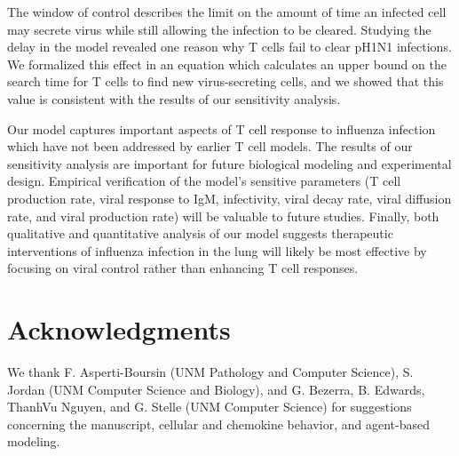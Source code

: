 \documentclass[10pt]{article}
\begin{document}
The window of control describes the limit on the amount of time an infected cell may secrete virus while still allowing the infection to be cleared.  Studying the delay in the model revealed one reason why T cells fail to clear pH1N1 infections.  We formalized this effect in an equation which calculates an upper bound on the search time for T cells to find new virus-secreting cells, and we showed that this value is consistent with the results of our sensitivity analysis.

Our model captures important aspects of T cell response to influenza infection which have not been addressed by earlier T cell models.  The results of our sensitivity analysis are important for future biological modeling and experimental design.  Empirical verification of the model's sensitive parameters (T cell production rate, viral response to IgM, infectivity, viral decay rate, viral diffusion rate, and viral production rate) will be valuable to future studies.  Finally, both qualitative and quantitative analysis of our model suggests therapeutic interventions of influenza infection in the lung will likely be most effective by focusing on viral control rather than enhancing T cell responses.









\section*{Acknowledgments}

We thank F. Asperti-Boursin (UNM Pathology and Computer Science), S. Jordan (UNM Computer Science and Biology), and G. Bezerra, B. Edwards, ThanhVu Nguyen, and G. Stelle (UNM Computer Science) for suggestions concerning the manuscript, cellular and chemokine behavior, and agent-based modeling.
\end{document}
